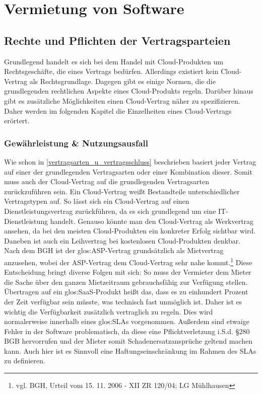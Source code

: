 \chapter{Vermietung von Software}
\section{Rechte und Pflichten der Vertragsparteien}
Grundlegend handelt es sich bei dem Handel mit Cloud-Produkten um Rechtsgesch\"afte, die eines Vertrags bed\"urfen. Allerdings existiert kein {\glqq}Cloud-Vertrag{\grqq} als Rechtsgrundlage. Dagegen gibt es einige Normen, die die grundlegenden rechtlichen Aspekte eines Cloud-Produkts regeln. Dar\"uber hinaus gibt es zus\"atzliche M\"oglichkeiten einen {\glqq}Cloud-Vertrag{\grqq} n\"aher zu spezifizieren. Daher werden im folgenden Kapitel die Einzelheiten eines {\glqq}Cloud-Vertrags{\grqq} er\"ortert.

  \subsection{Gew\"ahrleistung \& Nutzungsausfall}
Wie schon in \vref{vertragsarten_u_vertragsschluss} beschrieben basiert jeder Vertrag auf einer der grundlegenden Vertragsarten oder einer Kombination dieser. Somit muss auch der {\glqq}Cloud-Vertrag{\grqq} auf die grundlegenden Vertragsarten zur\"uckzuf\"uhren sein.  Ein {\glqq}Cloud-Vertrag{\grqq} wei{\ss}t Bestandteile unterschiedlicher Vertragstypen auf. So l\"asst sich ein {\glqq}Cloud-Vertrag{\grqq} auf einen Dienstleistungsvertrag zur\"uckf\"uhren, da es sich grundlegend um eine IT-Dienstleistung handelt. Genauso k\"onnte man den {\glqq}Cloud-Vertrag{\grqq} als Werkvertrag ansehen, da bei den meisten Cloud-Produkten ein konkreter Erfolg sichtbar wird. Daneben ist auch ein Leihvertrag bei kostenlosen Cloud-Produkten denkbar. Nach dem BGH ist der \gls{glos:ASP}-Vertrag grunds\"atzlich als Mietvertrag anzusehen, wobei der ASP-Vertrag dem {\glqq}Cloud-Vertrag{\grqq} sehr nahe kommt.\footnote{vgl. BGH, Urteil vom 15. 11. 2006 - XII ZR 120/04; LG M\"uhlhausen} 
Diese Entscheidung bringt diverse Folgen mit sich:\newline
So muss der Vermieter dem Mieter die Sache \"uber den ganzen Mietzeitraum gebrauchsf\"ahig zur Verf\"ugung stellen. \"Ubertragen auf ein \gls{glos:SaaS}-Produkt hei{\ss}t das, dass es zu einhundert Prozent der Zeit verf\"ugbar sein m\"usste, was technisch fast unm\"oglich ist. Daher ist es wichtig die Verf\"ugbarkeit zus\"atzlich vertraglich zu regeln. Dies wird normalerweise innerhalb eines \gls{glos:SLA}s vorgenommen. Au{\ss}erdem sind etwaige Fehler in der Software problematisch, da diese eine Pflichtverletzung i.S.d. §280 BGB hervorrufen und der Mieter somit Schadenersatzanspr\"uche geltend machen kann. Auch hier ist es Sinnvoll eine Haftungseinschr\"ankung im Rahmen des SLAs zu definieren.

